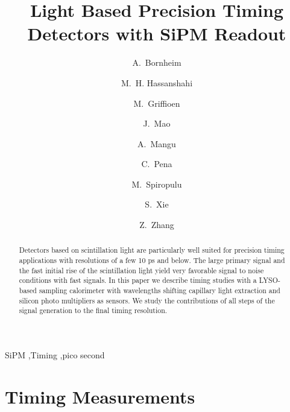 \documentclass[preprint,1p]{elsarticle}
\begin{document}
  
\linenumbers

\begin{frontmatter}

\title{Light Based Precision Timing Detectors with SiPM Readout}

\author[1]{A.~Bornheim}
\author[2]{M.~H. Hassanshahi}
\author[1]{M.~Griffioen}
\author[1]{J.~Mao}
\author[1]{A.~Mangu}
\author[1]{C.~Pena}
\author[1]{M.~Spiropulu}
\author[1]{S.~Xie }
\author[1]{Z.~Zhang}
\address[1]{California Institute of Technology, Pasadena, CA, USA}
\address[2]{Institute for Research in Fundamental Science, Tehran, Iran}


\begin{abstract}
Detectors based on scintillation light are particularly well suited for precision timing applications with 
resolutions of a few 10 ps and below. The large primary signal and the fast initial rise of the scintillation
light yield very favorable signal to noise conditions with fast signals. In this paper we describe timing 
studies with a LYSO-based sampling calorimeter with wavelengths shifting capillary light extraction and silicon
photo multipliers as sensors. We study the contributions of all steps of the signal generation to 
the final timing resolution. 
\end{abstract}

\begin{keyword}
SiPM \sep Timing \sep pico second
\end{keyword}

\end{frontmatter}

%
%

%
%
  
%
%
  
%
%

\section{Timing Measurements} 
\end{document}
